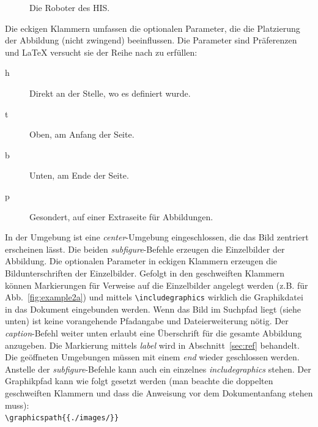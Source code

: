 \documentclass[english,ngerman]{KITreprt}
\begin{document}
\begin{figure}[htbp]
\begin{center}
\hspace{1cm}            
\caption{Die Roboter des HIS.}
\label{fig:example}
\end{center}
\end{figure}


Die eckigen Klammern umfassen die optionalen Parameter, die die Platzierung der Abbildung (nicht zwingend) beeinflussen. 
Die Parameter sind Pr\"aferenzen und \LaTeX{} versucht sie der Reihe nach zu erf\"ullen:
\begin{description}
\item[h] Direkt an der Stelle, wo es definiert wurde.
\item[t] Oben, am Anfang der Seite.
\item[b] Unten, am Ende der Seite.
\item[p] Gesondert, auf einer Extraseite f\"ur Abbildungen.
\end{description}
In der Umgebung ist eine \emph{center}-Umgebung eingeschlossen, die das Bild zentriert erscheinen l\"asst. 
Die beiden \emph{subfigure}-Befehle erzeugen die Einzelbilder der Abbildung.
Die optionalen Parameter in eckigen Klammern erzeugen die Bildunterschriften der Einzelbilder.
Gefolgt in den geschweiften Klammern k\"onnen Markierungen f\"ur Verweise auf die Einzelbilder angelegt werden (z.B. f\"ur Abb.~\ref{fig:example2a})
und mittels \texttt{\textbackslash includegraphics} wirklich die Graphikdatei in das Dokument eingebunden werden.
Wenn das Bild im Suchpfad liegt (siehe unten) ist keine vorangehende Pfadangabe und Dateierweiterung n\"otig. 
Der \emph{caption}-Befehl weiter unten erlaubt eine \"Uberschrift f\"ur die gesamte Abbildung anzugeben.
Die Markierung mittels \emph{label} wird in Abschnitt~\ref{sec:ref} behandelt.
Die ge\"offneten Umgebungen m\"ussen mit einem \emph{end} wieder geschlossen werden.
Anstelle der \emph{subfigure}-Befehle kann auch ein einzelnes \emph{includegraphics} stehen.
Der Graphikpfad kann wie folgt gesetzt werden (man beachte die doppelten geschweiften Klammern und dass die Anweisung vor dem Dokumentanfang stehen muss):\\
\lstinline[language={[LaTeX]TeX}]!\graphicspath{{./images/}}!
\end{document}
